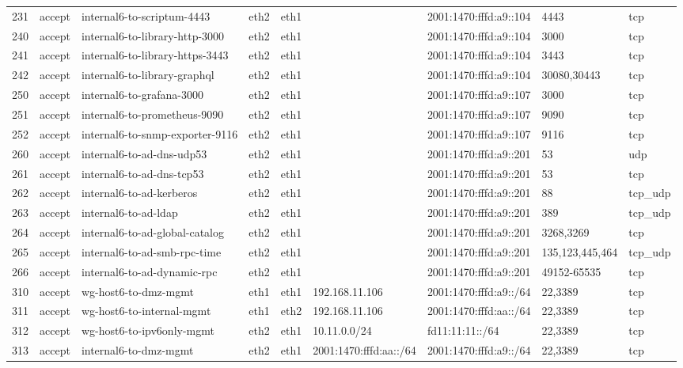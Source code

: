 \begin{longtable}{|l|l|l|l|l|l|l|p{2.2cm}|l|}
231 & accept & internal6-to-scriptum-4443 & eth2 & eth1 &  & 2001:1470:fffd:a9::104 & 4443 & tcp \\
240 & accept & internal6-to-library-http-3000 & eth2 & eth1 &  & 2001:1470:fffd:a9::104 & 3000 & tcp \\
241 & accept & internal6-to-library-https-3443 & eth2 & eth1 &  & 2001:1470:fffd:a9::104 & 3443 & tcp \\
242 & accept & internal6-to-library-graphql & eth2 & eth1 &  & 2001:1470:fffd:a9::104 & 30080,30443 & tcp \\
250 & accept & internal6-to-grafana-3000 & eth2 & eth1 &  & 2001:1470:fffd:a9::107 & 3000 & tcp \\
251 & accept & internal6-to-prometheus-9090 & eth2 & eth1 &  & 2001:1470:fffd:a9::107 & 9090 & tcp \\
252 & accept & internal6-to-snmp-exporter-9116 & eth2 & eth1 &  & 2001:1470:fffd:a9::107 & 9116 & tcp \\
260 & accept & internal6-to-ad-dns-udp53 & eth2 & eth1 &  & 2001:1470:fffd:a9::201 & 53 & udp \\
261 & accept & internal6-to-ad-dns-tcp53 & eth2 & eth1 &  & 2001:1470:fffd:a9::201 & 53 & tcp \\
262 & accept & internal6-to-ad-kerberos & eth2 & eth1 &  & 2001:1470:fffd:a9::201 & 88 & tcp_udp \\
263 & accept & internal6-to-ad-ldap & eth2 & eth1 &  & 2001:1470:fffd:a9::201 & 389 & tcp_udp \\
264 & accept & internal6-to-ad-global-catalog & eth2 & eth1 &  & 2001:1470:fffd:a9::201 & 3268,3269 & tcp \\
265 & accept & internal6-to-ad-smb-rpc-time & eth2 & eth1 &  & 2001:1470:fffd:a9::201 & 135,123,445,464 & tcp_udp \\
266 & accept & internal6-to-ad-dynamic-rpc & eth2 & eth1 &  & 2001:1470:fffd:a9::201 & 49152-65535 & tcp \\
310 & accept & wg-host6-to-dmz-mgmt & eth1 & eth1 & 192.168.11.106 & 2001:1470:fffd:a9::/64 & 22,3389 & tcp \\
311 & accept & wg-host6-to-internal-mgmt & eth1 & eth2 & 192.168.11.106 & 2001:1470:fffd:aa::/64 & 22,3389 & tcp \\
312 & accept & wg-host6-to-ipv6only-mgmt & eth2 & eth1 & 10.11.0.0/24 & fd11:11:11::/64 & 22,3389 & tcp \\
313 & accept & internal6-to-dmz-mgmt & eth2 & eth1 & 2001:1470:fffd:aa::/64 & 2001:1470:fffd:a9::/64 & 22,3389 & tcp \\

\end{longtable}
